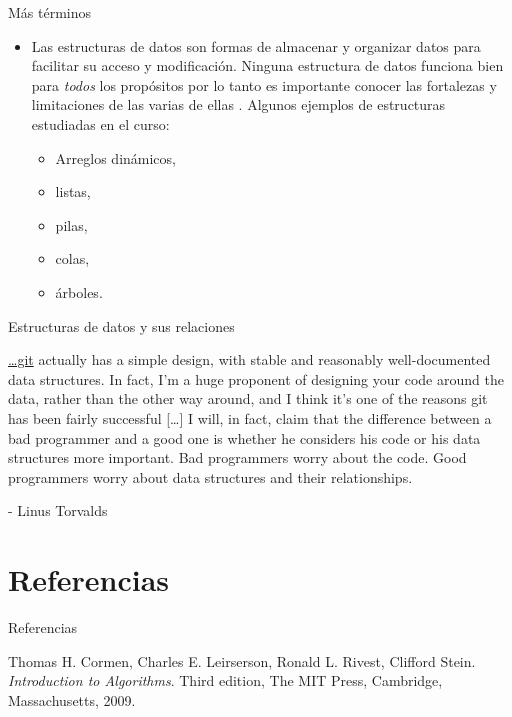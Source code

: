 \documentclass[aspectratio=169]{beamer}
\begin{document}
\begin{frame}{Más términos}

  \begin{itemize}
    \item Las \alert{estructuras de datos} son formas de almacenar y organizar datos para facilitar su acceso y modificación. Ninguna estructura de datos funciona bien para \emph{todos} los propósitos por lo tanto es importante conocer las fortalezas y limitaciones de las varias de ellas \cite{cormen}. Algunos ejemplos de estructuras estudiadas en el curso:
    \begin{itemize}
      \item Arreglos dinámicos,
      \item listas,
      \item pilas,
      \item colas,
      \item árboles.
    \end{itemize}
  \end{itemize}

\end{frame}

\begin{frame}{Estructuras de datos y sus relaciones}

  \href{http://git-scm.com/}{…git} actually has a simple design, with stable and reasonably well-documented data structures. In fact, I'm a huge proponent of designing your code around the data, rather than the other way around, and I think it's one of the reasons git has been fairly successful […] I will, in fact, claim that the difference between a bad programmer and a good one is whether he considers his code or his data structures more important. \alert{Bad programmers worry about the code. Good programmers worry about data structures and their relationships}.

\hfill - Linus Torvalds

\end{frame}

\section{Referencias}
\begin{frame}{Referencias}
  \begin{thebibliography}{9}
    Thomas H. Cormen, Charles E. Leirserson, Ronald L. Rivest, Clifford Stein.
    \textit{Introduction to Algorithms}. Third edition, The MIT Press, Cambridge, Massachusetts, 2009.
  \end{thebibliography}
\end{frame}
\end{document}
